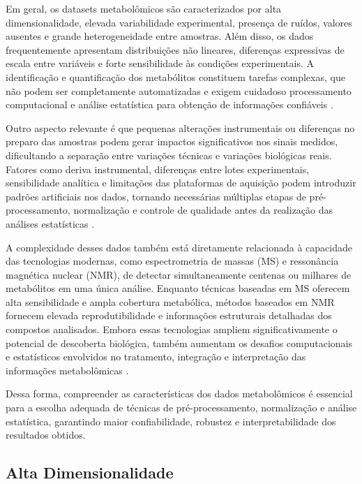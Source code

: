 Em geral, os datasets metabolômicos são caracterizados por alta dimensionalidade, elevada variabilidade experimental, presença de ruídos, valores ausentes e grande heterogeneidade entre amostras. Além disso, os dados frequentemente apresentam distribuições não lineares, diferenças expressivas de escala entre variáveis e forte sensibilidade às condições experimentais. A identificação e quantificação dos metabólitos constituem tarefas complexas, que não podem ser completamente automatizadas e exigem cuidadoso processamento computacional e análise estatística para obtenção de informações confiáveis \cite{shahjaman2021rmisbeta}.

Outro aspecto relevante é que pequenas alterações instrumentais ou diferenças no preparo das amostras podem gerar impactos significativos nos sinais medidos, dificultando a separação entre variações técnicas e variações biológicas reais. Fatores como deriva instrumental, diferenças entre lotes experimentais, sensibilidade analítica e limitações das plataformas de aquisição podem introduzir padrões artificiais nos dados, tornando necessárias múltiplas etapas de pré-processamento, normalização e controle de qualidade antes da realização das análises estatísticas \cite{shahjaman2021rmisbeta}.

A complexidade desses dados também está diretamente relacionada à capacidade das tecnologias modernas, como espectrometria de massas (MS) e ressonância magnética nuclear (NMR), de detectar simultaneamente centenas ou milhares de metabólitos em uma única análise. Enquanto técnicas baseadas em MS oferecem alta sensibilidade e ampla cobertura metabólica, métodos baseados em NMR fornecem elevada reprodutibilidade e informações estruturais detalhadas dos compostos analisados. Embora essas tecnologias ampliem significativamente o potencial de descoberta biológica, também aumentam os desafios computacionais e estatísticos envolvidos no tratamento, integração e interpretação das informações metabolômicas \cite{NMR}.

Dessa forma, compreender as características dos dados metabolômicos é essencial para a escolha adequada de técnicas de pré-processamento, normalização e análise estatística, garantindo maior confiabilidade, robustez e interpretabilidade dos resultados obtidos.

\subsection{Alta Dimensionalidade}

